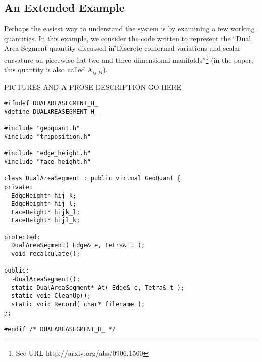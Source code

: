 \documentclass[10pt]{article}%
\begin{document}
\subsection*{An Extended Example}

Perhaps the easiest way to understand the system is by examining a few working quantities. In this example, we consider the code written to represent the ``Dual Area Segment\"{} quantity discussed in  \"{}Discrete conformal variations and scalar curvature on piecewise flat two and three dimensional manifolds''\footnote{See URL http://arxiv.org/abs/0906.1560} (in the paper, this quantity is also called A\(_{ij,kl}\)).

PICTURES AND A PROSE DESCRIPTION GO HERE

{\small{\begin{verbatim} 
#ifndef DUALAREASEGMENT_H_
#define DUALAREASEGMENT_H_

#include "geoquant.h"
#include "triposition.h"

#include "edge_height.h"
#include "face_height.h"

class DualAreaSegment : public virtual GeoQuant {
private:
  EdgeHeight* hij_k;
  EdgeHeight* hij_l;
  FaceHeight* hijk_l;
  FaceHeight* hijl_k;

protected:
  DualAreaSegment( Edge& e, Tetra& t );
  void recalculate();

public:
  ~DualAreaSegment();
  static DualAreaSegment* At( Edge& e, Tetra& t );
  static void CleanUp();
  static void Record( char* filename );
};

#endif /* DUALAREASEGMENT_H_ */
\end{verbatim}
}}
\end{document}
